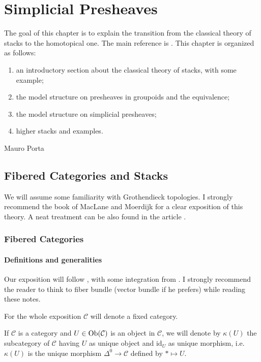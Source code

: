 \chapter{Simplicial Presheaves}

The goal of this chapter is to explain the transition from the classical theory of stacks to the homotopical one. The main reference is \cite{hollander}. This chapter is organized as follows:
\begin{enumerate}
\item an introductory section about the classical theory of stacks, with some example;
\item the model structure on presheaves in groupoids and the equivalence;
\item the model structure on simplicial presheaves;
\item higher stacks and examples.
\end{enumerate}

\begin{flushright}
Mauro Porta
\end{flushright}

\section{Fibered Categories and Stacks}

We will assume some familiarity with Grothendieck topologies. I strongly recommend the book of MacLane and Moerdijk \cite[Ch. III]{sheaves} for a clear exposition of this theory. A neat treatment can be also found in the article \cite[Ch. II]{vistoli}.

\subsection{Fibered Categories}

\subsubsection*{Definitions and generalities}

Our exposition will follow \cite[Ch. III]{vistoli}, with some integration from \cite[Exposé VI]{sga1}. I strongly recommend the reader to think to fiber bundle (vector bundle if he prefers) while reading these notes.

For the whole exposition $\mathcal C$ will denote a fixed category.

\begin{notation}
If $\mathcal C$ is a category and $U \in \mathrm{Ob}(\mathcal C)$ is an object in $\mathcal C$, we will denote by $\kappa(U)$ the subcategory of $\mathcal C$ having $U$ as unique object and $\mathrm{id}_U$ as unique morphism, i.e. $\kappa(U)$ is the unique morphism $\Delta^0 \to \mathcal C$ defined by $* \mapsto U$.
\end{notation}

